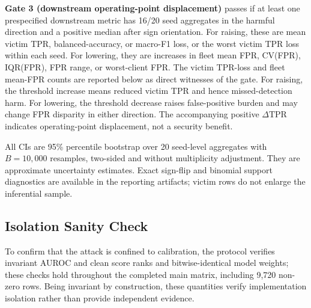 \textbf{Gate 3 (downstream operating-point displacement)} passes if at least one prespecified downstream metric has 16/20 seed aggregates in the harmful direction and a positive median after sign orientation. For raising, these are mean victim TPR, balanced-accuracy, or macro-F1 loss, or the worst victim TPR loss within each seed. For lowering, they are increases in fleet mean FPR, CV(FPR), IQR(FPR), FPR range, or worst-client FPR. The victim TPR-loss and fleet mean-FPR counts are reported below as direct witnesses of the gate.
For raising, the threshold increase means reduced victim TPR and hence missed-detection harm.
For lowering, the threshold decrease raises false-positive burden and may change FPR disparity in either direction. The accompanying positive $\Delta\mathrm{TPR}$ indicates operating-point displacement, not a security benefit.

All CIs are 95\% percentile bootstrap over 20 seed-level aggregates with $B{=}10{,}000$ resamples, two-sided and without multiplicity adjustment. They are approximate uncertainty estimates. Exact sign-flip and binomial support diagnostics are available in the reporting artifacts; victim rows do not enlarge the inferential sample.

\subsection{Isolation Sanity Check}

To confirm that the attack is confined to calibration, the protocol verifies invariant AUROC and clean score ranks and bitwise-identical model weights; these checks hold throughout the completed main matrix, including 9,720 non-zero rows.
Being invariant by construction, these quantities verify implementation isolation rather than provide independent evidence.
